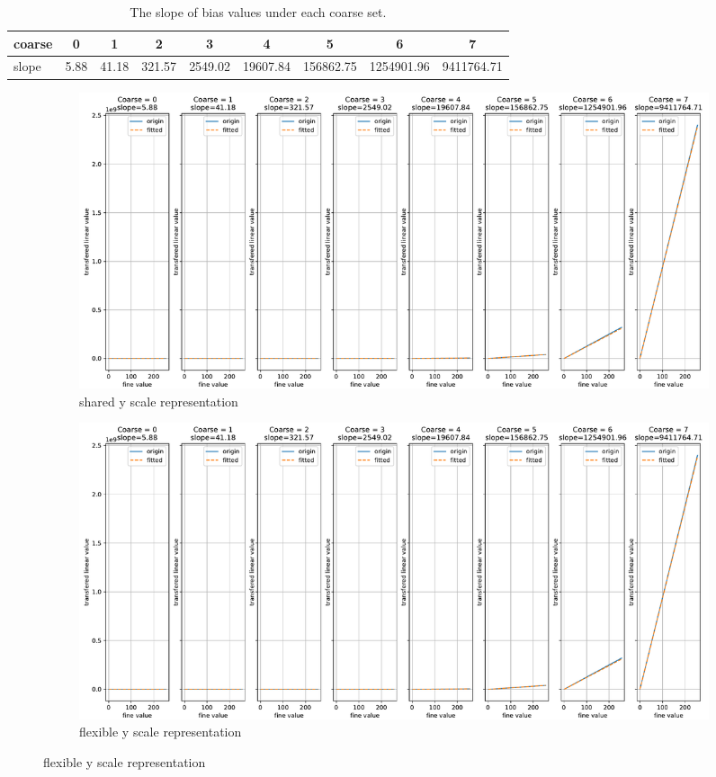 \begin{table}
	\centering
	\begin{tabular}{lcccccccc}
		\toprule
		coarse & 0     & 1     & 2     & 3     & 4     & 5     & 6     & 7 \\
		\midrule
		slope & 5.88  & 41.18 & 321.57 & 2549.02 & 19607.84 & 156862.75 & 1254901.96 & 9411764.71 \\
		\bottomrule
	\end{tabular}%
	\caption{The slope of bias values under each coarse set.}
	\label{tab:cf2l}%
\end{table}%


\begin{figure}
	\begin{subfigure}{\textwidth}
		\centering
		\includegraphics[page=1, width=\columnwidth]{./img/implementation/cf2linear.pdf}
		\caption{shared y scale representation}
		\label{fig:cf2l_absolute}
	\end{subfigure}
	\begin{subfigure}{\textwidth}
		\centering
		\includegraphics[page=2, width=\columnwidth]{./img/implementation/cf2linear.pdf}
		\caption{flexible y scale representation}
		\label{fig:cf2l_absolute2}
	\end{subfigure}

\end{figure}
